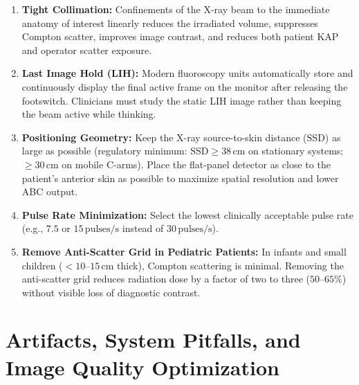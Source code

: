 \documentclass[11pt,a4paper]{article}
\begin{document}
\begin{enumerate}[leftmargin=*]
    \item \textbf{Tight Collimation:} Confinements of the X-ray beam to the immediate anatomy of interest linearly reduces the irradiated volume, suppresses Compton scatter, improves image contrast, and reduces both patient KAP and operator scatter exposure.
    \item \textbf{Last Image Hold (LIH):} Modern fluoroscopy units automatically store and continuously display the final active frame on the monitor after releasing the footswitch. Clinicians must study the static LIH image rather than keeping the beam active while thinking.
    \item \textbf{Positioning Geometry:} Keep the X-ray source-to-skin distance ($\text{SSD}$) as large as possible (regulatory minimum: $\text{SSD} \ge 38\,\text{cm}$ on stationary systems; $\ge 30\,\text{cm}$ on mobile C-arms). Place the flat-panel detector as close to the patient's anterior skin as possible to maximize spatial resolution and lower ABC output.
    \item \textbf{Pulse Rate Minimization:} Select the lowest clinically acceptable pulse rate (e.g., $7.5$ or $15\,\text{pulses/s}$ instead of $30\,\text{pulses/s}$).
    \item \textbf{Remove Anti-Scatter Grid in Pediatric Patients:} In infants and small children ($< 10\text{--}15\,\text{cm}$ thick), Compton scattering is minimal. Removing the anti-scatter grid reduces radiation dose by a factor of two to three ($50\text{--}65\%$) without visible loss of diagnostic contrast.
\end{enumerate}

\section{Artifacts, System Pitfalls, and Image Quality Optimization}
\end{document}
